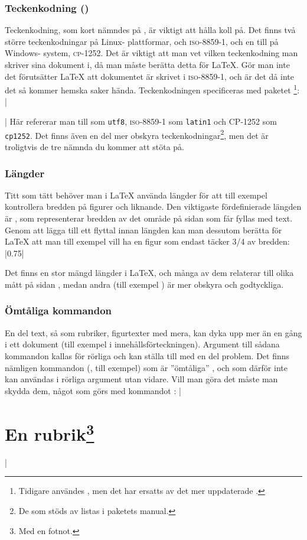 \documentclass[lang=sv,ptsize=10pt,font=none,nomath,titles=bf,../../a4.tex]{subfiles}
\begin{document}
\subsubsection{Teckenkodning (\UTF)}
Teckenkodning, som kort nämndes på , är
viktigt att hålla koll på. Det finns två större teckenkodningar på Linux-%
plattformar, \UTF{} och \textsc{iso-8859-1}, och en till på Windows-%
system, \textsc{cp-1252}. Det är viktigt att man vet vilken teckenkodning
man skriver sina dokument i, då man måste berätta detta för \LaTeX. Gör
man inte det förutsätter \LaTeX{} att dokumentet är skrivet i
\textsc{iso-8859-1}, och är det då inte det så kommer hemska saker hända.
Teckenkodningen specificeras med paketet %
\footnote{Tidigare användes , men det har ersatts av det
mer uppdaterade .}:
\latex|\usepackage[<teckenkodning>]{inputenx}|
Här refererar man till \UTF{} som \texttt{utf8}, \textsc{iso-8859-1} som
\texttt{latin1} och \textsc{CP-1252} som \texttt{cp1252}. Det finns även
en del mer obskyra teckenkodningar\footnote{De som stöds av 
 listas i paketets manual.}, men det är troligtvis de tre
nämnda du kommer att stöta på.

\subsubsection{Längder}
Titt som tätt behöver man i \LaTeX{} använda längder för att till exempel
kontrollera bredden på figurer och liknande. Den viktigaste fördefinierade
längden är , som representerar bredden av det område på
sidan som får fyllas med text. Genom att lägga till ett flyttal innan
längden kan man dessutom berätta för \LaTeX{} att man till exempel vill
ha en figur som endast täcker \num{3/4} av bredden:
\latex|0.75\textwidth|

Det finns en stor mängd längder i \LaTeX, och många av dem relaterar till
olika mått på sidan \parencite[132]{Oetiker11}, medan andra (till exempel
) är mer obskyra och godtyckliga.

\subsubsection{Ömtåliga kommandon}
En del text, så som rubriker, figurtexter med mera, kan dyka upp mer än en
gång i ett dokument (till exempel i innehållsförteckningen). Argument till
sådana kommandon kallas för rörliga  och kan ställa
till med en del problem. Det finns nämligen kommandon (,
till exempel) som är ”ömtåliga” , och som därför inte kan
användas i rörliga argument utan vidare. Vill man göra det måste man
skydda dem, något som görs med kommandot :
\latex|\section{En rubrik\protect\footnote{Med en fotnot.}}|
\end{document}
